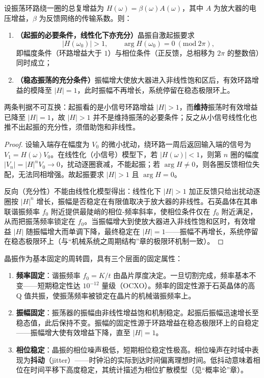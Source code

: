 \begin{lemma}\label{ch24_quartz_startup_lemma}
设振荡环路绕一圈的总复增益为 $H(\omega)=\beta(\omega)A(\omega)$，其中 $A$ 为放大器的电压增益，$\beta$ 为反馈网络的传输系数。则：
\begin{enumerate}[label=(\roman*)]
    \item \textbf{（起振的必要条件，线性化下亦充分）}晶振自激起振要求
\[
|H(\omega_0)| > 1, \qquad \arg H(\omega_0) = 0 \ (\text{mod}\ 2\pi),
\]
即幅度条件（环路增益大于 $1$）与相位条件（正反馈，总相移为 $2\pi$ 的整数倍）同时成立；
    \item \textbf{（稳态振荡的充分条件）}振幅增大使放大器进入非线性饱和区后，有效环路增益的模降至 $|H|=1$，此时振幅不再增长，系统停留在稳态极限环上。
\end{enumerate}
两条判据不可互换：起振看的是小信号环路增益 $|H|>1$，而\textbf{维持}振荡时有效增益已降至 $|H|=1$，故 $|H|>1$ 并不是维持振荡的必要条件；反之从小信号线性化也推不出起振的充分性，须借助饱和非线性。
\end{lemma}

\begin{proof}
设输入端存在幅度为 $V_0$ 的微小扰动，绕环路一周后返回输入端的信号为 $V_1 = H(\omega)V_0$。在线性化（小信号）模型下，若 $|H(\omega)|<1$，则第 $n$ 圈的幅度 $|V_n| = |H|^n V_0 \to 0$，扰动逐圈衰减，不能起振；若 $\arg H \neq 0$，则各圈反馈相位失配，无法同相增强。故起振要求 $|H|>1$ 且 $\arg H = 0$。

反向（充分性）不能由线性化模型得出：线性化下 $|H|>1$ 加正反馈只给出扰动逐圈按 $|H|^n$ 增长，振幅是否稳定在有限值取决于放大器的非线性。石英晶体在其串联谐振频率 $f_0$ 附近提供最陡峭的相位-频率斜率，使相位条件仅在 $f_0$ 附近满足，从而把振荡频率锁定在 $f_0$。当振幅增大到使放大器进入非线性饱和区时，有效增益 $|H|$ 随振幅增大而单调下降，最终稳定在 $|H|=1$——振幅不再增长，系统停留在稳态极限环上（与“机械系统之周期结构”章的极限环机制一致）。
\end{proof}

\begin{proposition}[晶振的三个固定属性]\label{prop:quartz_three_fixed}
晶振作为基本固定的周转圆，具有三个层面的固定属性：
\begin{enumerate}[label=(\roman*)]
    \item \textbf{频率固定}：谐振频率 $f_0 = K/t$ 由晶片厚度决定。一旦切割完成，频率基本不变——短期稳定性达 $10^{-12}$ 量级（OCXO）。频率的固定性源于石英晶体的高 Q 值共振，使振荡频率被锁定在晶片的机械谐振频率上。
    \item \textbf{振幅固定}：振荡器的振幅由非线性增益饱和机制稳定。起振后振幅迅速增长至稳态值，此后保持不变。振幅的固定性源于环路增益在稳态极限环上的自稳定——振幅增大使有效增益下降，直至 $|H|=1$。
    \item \textbf{相位稳定}：晶振的相位噪声极低，短期相位稳定性极高。相位噪声在时域中表现为\textbf{抖动}（jitter）——时钟沿的实际到达时间偏离理想时间。低抖动意味着相位在时间平移下高度稳定，其统计描述为相位扩散模型（见“概率论”章）。
\end{enumerate}
\end{proposition}

